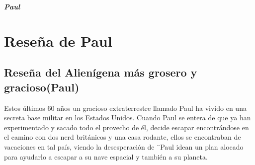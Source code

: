 \documentclass[11pt]{article}
\begin{document}
\begin{center}
\textit{\textbf{\huge{Paul}}}    
\end{center}

\pagecolor{yellow}

\section{Reseña de Paul}
\subsection{Reseña del Alienígena más grosero y gracioso(Paul)}
Estos últimos 60 años un gracioso extraterrestre llamado Paul ha vivido en una secreta base militar en los Estados Unidos. Cuando Paul se entera de que ya han experimentado y sacado todo el provecho de él, decide escapar encontrándose en el camino con dos nerd británicos y una casa rodante, ellos se encontraban de vacaciones en tal país, viendo la desesperación de ¨Paul idean un plan alocado para ayudarlo a escapar a su nave espacial y también a su planeta. 
\end{document}

